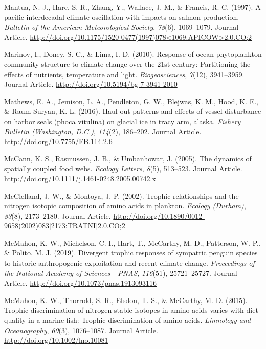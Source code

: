 \documentclass [11pt, proquest] {uwthesis}[2015/03/03]
\begin{document}
\hypertarget{ref-Mantua1997}{}
Mantua, N. J., Hare, S. R., Zhang, Y., Wallace, J. M., \& Francis, R. C.
(1997). A pacific interdecadal climate oscillation with impacts on
salmon production. \emph{Bulletin of the American Meteorological
Society}, \emph{78}(6), 1069--1079. Journal Article.
\href{http://doi.org/10.1175/1520-0477(1997)078\%3C1069:APICOW\%3E2.0.CO;2}{http://doi.org/10.1175/1520-0477(1997)078\textless{}1069:APICOW\textgreater{}2.0.CO;2}

\hypertarget{ref-Marinov2010}{}
Marinov, I., Doney, S. C., \& Lima, I. D. (2010). Response of ocean
phytoplankton community structure to climate change over the 21st
century: Partitioning the effects of nutrients, temperature and light.
\emph{Biogeosciences}, \emph{7}(12), 3941--3959. Journal Article.
\url{http://doi.org/10.5194/bg-7-3941-2010}

\hypertarget{ref-Mathews2016}{}
Mathews, E. A., Jemison, L. A., Pendleton, G. W., Blejwas, K. M., Hood,
K. E., \& Raum-Suryan, K. L. (2016). Haul-out patterns and effects of
vessel disturbance on harbor seals (phoca vitulina) on glacial ice in
tracy arm, alaska. \emph{Fishery Bulletin (Washington, D.C.)},
\emph{114}(2), 186--202. Journal Article.
\url{http://doi.org/10.7755/FB.114.2.6}

\hypertarget{ref-McCann2005}{}
McCann, K. S., Rasmussen, J. B., \& Umbanhowar, J. (2005). The dynamics
of spatially coupled food webs. \emph{Ecology Letters}, \emph{8}(5),
513--523. Journal Article.
\url{http://doi.org/10.1111/j.1461-0248.2005.00742.x}

\hypertarget{ref-McClelland2002}{}
McClelland, J. W., \& Montoya, J. P. (2002). Trophic relationships and
the nitrogen isotopic composition of amino acids in plankton.
\emph{Ecology (Durham)}, \emph{83}(8), 2173--2180. Journal Article.
\href{http://doi.org/10.1890/0012-9658(2002)083\%5B2173:TRATNI\%5D2.0.CO;2}{http://doi.org/10.1890/0012-9658(2002)083{[}2173:TRATNI{]}2.0.CO;2}

\hypertarget{ref-McMahon2019}{}
McMahon, K. W., Michelson, C. I., Hart, T., McCarthy, M. D., Patterson,
W. P., \& Polito, M. J. (2019). Divergent trophic responses of sympatric
penguin species to historic anthropogenic exploitation and recent
climate change. \emph{Proceedings of the National Academy of Sciences -
PNAS}, \emph{116}(51), 25721--25727. Journal Article.
\url{http://doi.org/10.1073/pnas.1913093116}

\hypertarget{ref-McMahon2015}{}
McMahon, K. W., Thorrold, S. R., Elsdon, T. S., \& McCarthy, M. D.
(2015). Trophic discrimination of nitrogen stable isotopes in amino
acids varies with diet quality in a marine fish: Trophic discrimination
of amino acids. \emph{Limnology and Oceanography}, \emph{60}(3),
1076--1087. Journal Article. \url{http://doi.org/10.1002/lno.10081}
\end{document}
